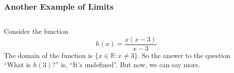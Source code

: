 \documentclass[serif,ignorenonframetext]{beamer}
\begin{document}
\begin{frame}
  \frametitle{Another Example of Limits}
  \begin{columns}
  Consider the function
  \begin{displaymath}
    h(x) = \frac{x(x-3)}{x-3}
  \end{displaymath}
  The domain of the function is $\{x\in\mathbb{R}:x\ne 3\}$.  So the answer
  to the question ``What is $h(3)$?'' is, ``It's undefined''.  But now, 
  we can say more.
  \end{columns}
\end{frame}
\end{document}
